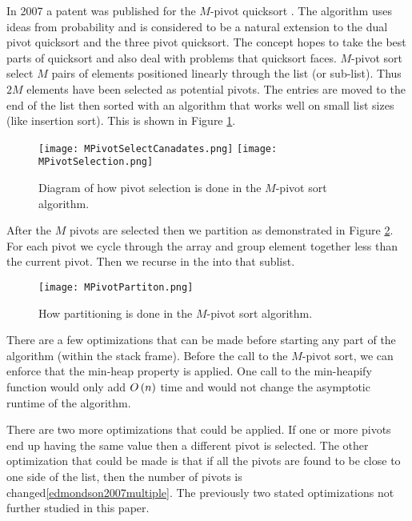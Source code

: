 		In 2007 a patent was published for the $M$-pivot quicksort \cite{edmondson2007multiple}. The algorithm uses ideas from probability and is considered to be a natural extension to the dual pivot quicksort and the three pivot quicksort. The concept hopes to take the best parts of quicksort and also deal with problems that quicksort faces. $M$-pivot sort select $M$ pairs of elements positioned linearly through the list (or sub-list).  Thus $2M$ elements have been selected as potential pivots. The entries are moved to the end of the list then sorted with an algorithm that works well on small list sizes (like insertion sort). This is shown in Figure \ref{fig:MPivotSelecton}.
		\begin{figure}[ht!]
			\begin{center}
				\texttt{[image: MPivotSelectCanadates.png]}
				\texttt{[image: MPivotSelection.png]}
				\caption{Diagram of how pivot selection is done in the $M$-pivot sort algorithm.}
				\label{fig:MPivotSelecton}
			\end{center}
		\end{figure}
		After the $M$ pivots are selected then we partition as demonstrated in Figure \ref{fig:MPivotPartition}. For each pivot we cycle through the array and group element together less than the current pivot. Then we recurse in the into that sublist.
		\begin{figure}[ht!]
			\begin{center}
				\texttt{[image: MPivotPartiton.png]}
				\caption{How partitioning is done in the $M$-pivot sort algorithm.}
				\label{fig:MPivotPartition}
			\end{center}
		\end{figure}
		There are a few optimizations that can be made before starting any part of the algorithm (within the stack frame)\cite{edmondson2007multiple}. Before the call to the $M$-pivot sort, we can enforce that the min-heap property is applied. One call to the min-heapify function would only add $O\left(n\right)$ time and would not change the asymptotic runtime of the algorithm.
		
		There are two more optimizations that could be applied. If one or more pivots end up having the same value then a different pivot is selected\cite{edmondson2007multiple}. The other optimization that could be made is that if all the pivots are found to be close to one side of the list, then the number of pivots is changed\ref{edmondson2007multiple}. The previously two stated optimizations not further studied in this paper.


